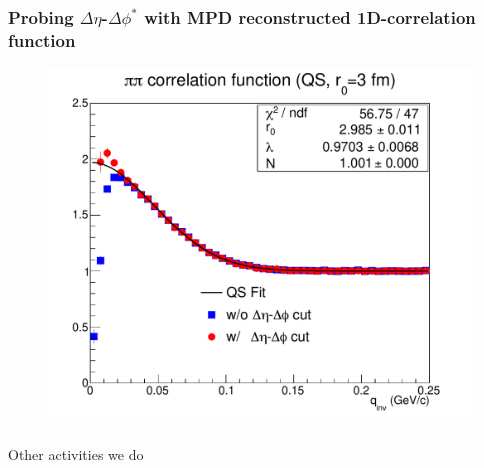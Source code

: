 \documentclass[dvipsnames] {beamer}
\begin{document}
         \begin{frame}
           \frametitle{\bf \centering \footnotesize Probing $\Delta \eta$-$\Delta \phi^{*}$ with MPD reconstructed 1D-correlation function}
              \begin{figure}[H]
            \includegraphics[width=.75\linewidth]{cfTest_new.pdf}
          \end{figure}
         \end{frame}
        
        \begin{frame}
          \frametitle{}
          \bf
          \begin{center}
            \Huge {Other activities we do}
          \end{center}
        \end{frame}
\end{document}
